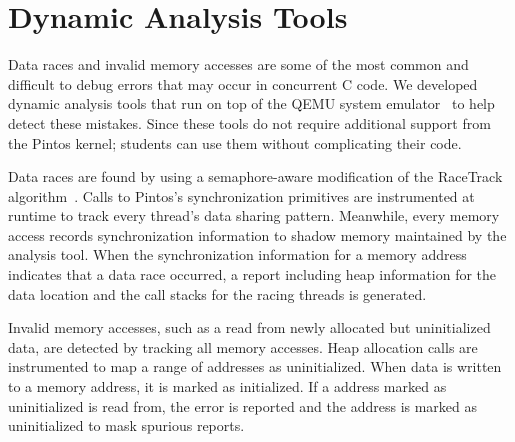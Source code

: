 \section{Dynamic Analysis Tools}

Data races and invalid memory accesses are some of the most common and
difficult to debug errors that may occur in concurrent C code.
We developed dynamic analysis tools that run on top of the QEMU
system emulator~\cite{Bellard2005QEMU} to help detect these mistakes. 
Since these tools do not require additional support from the Pintos kernel; 
students can use them without complicating their code.

Data races are found by using a semaphore-aware modification of the RaceTrack algorithm~\cite{Yu2005RaceTrack}. 
Calls to Pintos's synchronization primitives are instrumented at runtime to track every thread's data
sharing pattern.  Meanwhile, every memory access records synchronization information to shadow memory
maintained by the analysis tool. When the synchronization information for a memory address
indicates that a data race occurred, a report including heap information for the data location and the
call stacks for the racing threads is generated.

Invalid memory accesses, such as a read from newly allocated but uninitialized data, are detected by
tracking all memory accesses.  Heap allocation calls are instrumented to map a range of addresses as
uninitialized. When data is written to a memory address, it is marked as initialized. If a address
marked as uninitialized is read from, the error is reported and the address is marked as
uninitialized to mask spurious reports. 

